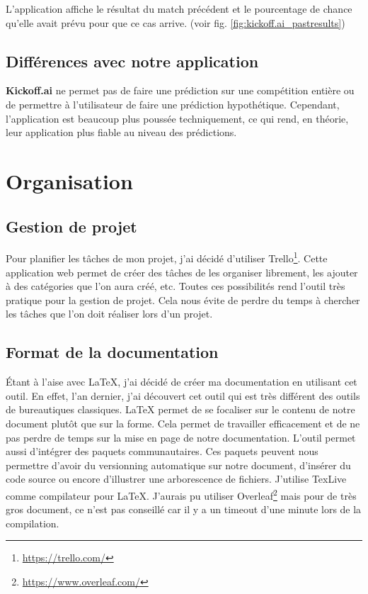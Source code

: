 \documentclass[a4paper,14pt]{extarticle}
\begin{document}
{L'application affiche le résultat du match précédent et le pourcentage de chance qu'elle avait prévu pour que ce cas arrive. (voir fig. \ref{fig:kickoff.ai_pastresults})

\subsection{Différences avec notre application}

\textbf{Kickoff.ai} ne permet pas de faire une prédiction sur une compétition entière ou de permettre à l'utilisateur de faire une prédiction hypothétique. Cependant, l'application est beaucoup plus poussée techniquement, ce qui rend, en théorie, leur application plus fiable au niveau des prédictions.

\section{Organisation}

\subsection{Gestion de projet}

Pour planifier les tâches de mon projet, j'ai décidé d'utiliser Trello\footnote{\url{https://trello.com/}}. Cette application web permet de créer des tâches de les organiser librement, les ajouter à des catégories que l'on aura créé, etc. Toutes ces possibilités rend l'outil très pratique pour la gestion de projet. Cela nous évite de perdre du temps à chercher les tâches que l'on doit réaliser lors d'un projet. 

\subsection{Format de la documentation}

Étant à l'aise avec \LaTeX, j'ai décidé de créer ma documentation en utilisant cet outil. En effet, l'an dernier, j'ai découvert cet outil qui est très différent des outils de bureautiques classiques. \LaTeX{} permet de se focaliser sur le contenu de notre document plutôt que sur la forme. Cela permet de travailler efficacement et de ne pas perdre de temps sur la mise en page de notre documentation. L'outil permet aussi d'intégrer des paquets communautaires. Ces paquets peuvent nous permettre d'avoir du versionning automatique sur notre document, d'insérer du code source ou encore d'illustrer une arborescence de fichiers. J'utilise TexLive comme compilateur pour \LaTeX. J'aurais pu utiliser Overleaf\footnote{\url{https://www.overleaf.com/}} mais pour de très gros document, ce n'est pas conseillé car il y a un timeout d'une minute lors de la compilation.

}
\end{document}
